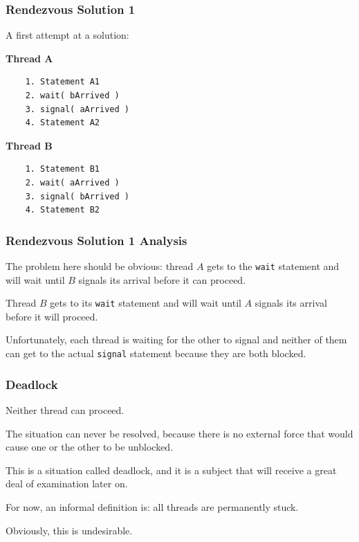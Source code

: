 \begin{frame}[fragile]
\frametitle{Rendezvous Solution 1}

A first attempt at a solution: 

\begin{multicols}{2}
\textbf{Thread A}
  \begin{verbatim}
	1. Statement A1
	2. wait( bArrived )
	3. signal( aArrived )
	4. Statement A2
  \end{verbatim}
\columnbreak
\textbf{Thread B}
  \begin{verbatim}
	1. Statement B1
	2. wait( aArrived )
	3. signal( bArrived )
	4. Statement B2
  \end{verbatim}
\end{multicols}
\vspace{-2em}


\end{frame}

\begin{frame}
\frametitle{Rendezvous Solution 1 Analysis}

The problem here should be obvious: thread $A$ gets to the \texttt{wait} statement and will wait until $B$ signals its arrival before it can proceed. 

Thread $B$ gets to its \texttt{wait} statement and will wait until $A$ signals its arrival before it will proceed. 

Unfortunately, each thread is waiting for the other to signal and neither of them can get to the actual \texttt{signal} statement because they are both blocked. 


\end{frame}

\begin{frame}
\frametitle{Deadlock}

Neither thread can proceed. 

The situation can never be resolved, because there is no external force that would cause one or the other to be unblocked. 

This is a situation called \alert{deadlock}, and it is a subject that will receive a great deal of examination later on. 

For now, an informal definition is: all threads are permanently stuck. 

Obviously, this is undesirable.

\end{frame}


